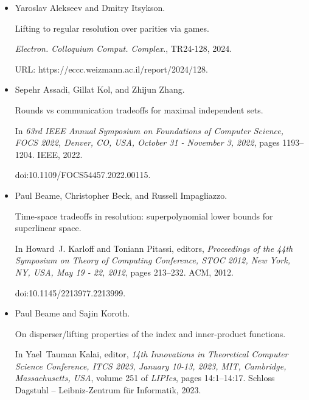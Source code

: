 \begin{itemize}


\item[] 
[1]

Yaroslav Alekseev and Dmitry Itsykson.


Lifting to regular resolution over parities via games.


\emph{Electron. Colloquium Comput. Complex.}, TR24-128, 2024.


URL: https://eccc.weizmann.ac.il/report/2024/128.





\item[] 
[2]

Sepehr Assadi, Gillat Kol, and Zhijun Zhang.


Rounds vs communication tradeoffs for maximal independent sets.


In \emph{63rd IEEE Annual Symposium on Foundations of Computer
Science, FOCS 2022, Denver, CO, USA, October 31 - November 3, 2022}, pages
1193–1204. IEEE, 2022.


doi:10.1109/FOCS54457.2022.00115.





\item[] 
[3]

Paul Beame, Christopher Beck, and Russell Impagliazzo.


Time-space tradeoffs in resolution: superpolynomial lower bounds for
superlinear space.


In Howard J. Karloff and Toniann Pitassi, editors, \emph{Proceedings
of the 44th Symposium on Theory of Computing Conference, STOC 2012, New
York, NY, USA, May 19 - 22, 2012}, pages 213–232. ACM, 2012.


doi:10.1145/2213977.2213999.





\item[] 
[4]

Paul Beame and Sajin Koroth.


On disperser/lifting properties of the index and inner-product
functions.


In Yael Tauman Kalai, editor, \emph{14th Innovations in Theoretical
Computer Science Conference, ITCS 2023, January 10-13, 2023, MIT,
Cambridge, Massachusetts, USA}, volume 251 of \emph{LIPIcs}, pages
14:1–14:17. Schloss Dagstuhl – Leibniz-Zentrum für Informatik, 2023.



\end{itemize}
